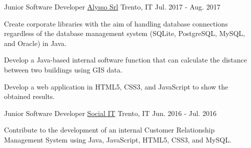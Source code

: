 \documentclass[11pt, a4paper]{awesome-cv}
\begin{document}
\begin{cventries}
  \cventry
    {Junior Software Developer} %
    {\href{https://www.alysso.it/}{Alysso Srl}} %
    {Trento, IT} %
    {Jul. 2017 - Aug. 2017} %
    {
      \begin{cvitems} %
        \item {Create corporate libraries with the aim of handling database connections regardless of the database management system (SQLite, PostgreSQL, MySQL, and Oracle) in Java.}
        \item {Develop a Java-based internal software function that can calculate the distance between two buildings using GIS data.}
        \item {Develop a web application in HTML5, CSS3, and JavaScript to show the obtained results.}
      \end{cvitems}
    }

  \cventry
    {Junior Software Developer} %
    {\href{https://www.socialit.it/en/}{Social IT}} %
    {Trento, IT} %
    {Jun. 2016 - Jul. 2016} %
    {
      \begin{cvitems} %
        \item {Contribute to the development of an internal Customer Relationship Management System using Java, JavaScript, HTML5, CSS3, and MySQL.}
      \end{cvitems}
    }

\end{cventries}
\end{document}
